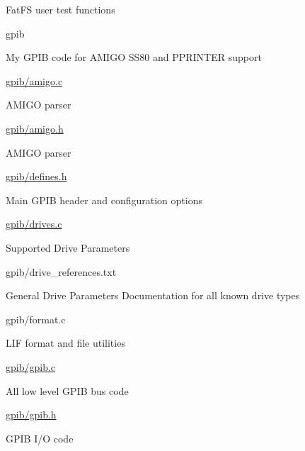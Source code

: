 {\begin{DoxyItemize}
\begin{DoxyItemize}
\begin{DoxyItemize}
\item Fat\+FS user test functions
\end{DoxyItemize}
\end{DoxyItemize}
\item gpib
\begin{DoxyItemize}
\item My G\+P\+IB code for A\+M\+I\+GO S\+S80 and P\+P\+R\+I\+N\+T\+ER support
\item \hyperlink{amigo_8c}{gpib/amigo.\+c}
\begin{DoxyItemize}
\item A\+M\+I\+GO parser
\end{DoxyItemize}
\item \hyperlink{amigo_8h}{gpib/amigo.\+h}
\begin{DoxyItemize}
\item A\+M\+I\+GO parser
\end{DoxyItemize}
\item \hyperlink{defines_8h}{gpib/defines.\+h}
\begin{DoxyItemize}
\item Main G\+P\+IB header and configuration options
\end{DoxyItemize}
\item \hyperlink{drives_8c}{gpib/drives.\+c}
\begin{DoxyItemize}
\item Supported Drive Parameters
\end{DoxyItemize}
\item gpib/drive\+\_\+references.\+txt
\begin{DoxyItemize}
\item General Drive Parameters Documentation for all known drive types
\end{DoxyItemize}
\item gpib/format.\+c
\begin{DoxyItemize}
\item L\+IF format and file utilities
\end{DoxyItemize}
\item \hyperlink{gpib_8c}{gpib/gpib.\+c}
\begin{DoxyItemize}
\item All low level G\+P\+IB bus code
\end{DoxyItemize}
\item \hyperlink{gpib_8h}{gpib/gpib.\+h}
\begin{DoxyItemize}
\item G\+P\+IB I/O code

\end{DoxyItemize}
\end{DoxyItemize}
\end{DoxyItemize}}
